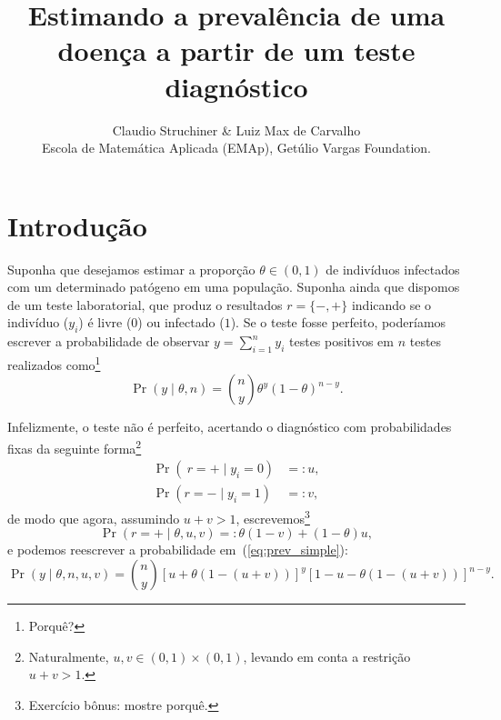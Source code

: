 \documentclass[a4paper, notitlepage, 10pt]{article}
\title{\vspace{-9ex}\centering \bf Estimando a prevalência de uma doença a partir de um teste diagnóstico}
\author{
Claudio Struchiner \& Luiz Max de Carvalho \\
Escola de Matemática Aplicada (EMAp), Get\'ulio Vargas Foundation.
}
\begin{document}
\maketitle

% 


\section*{Introdução}

Suponha que desejamos estimar a proporção $\theta \in (0, 1)$ de indivíduos infectados com um determinado patógeno em uma população.
Suponha ainda que dispomos de um teste laboratorial, que produz o resultados $r = \{-, +\}$ indicando se o indivíduo ($y_i$) é livre ($0$) ou infectado ($1$).
Se o teste fosse perfeito, poderíamos escrever a probabilidade de observar $y = \sum_{i =1}^n y_i$ testes positivos em $n$ testes realizados como\footnote{Porquê?}
\begin{equation}
\label{eq:prev_simple}
 \operatorname{Pr}\left( y \mid \theta, n \right) = \binom{n}{y} \theta^y (1-\theta)^{n-y}. 
\end{equation}

Infelizmente, o teste não é perfeito, acertando o diagnóstico com probabilidades fixas da seguinte forma\footnote{Naturalmente, $u, v \in (0, 1) \times (0, 1)$, levando em conta a restrição $u + v > 1$.}
\begin{align}
 \operatorname{Pr}\left(\ r = + \mid y_i = 0 \right) &=: u,\\
 \operatorname{Pr}\left( r = - \mid y_i = 1 \right) &=: v,
\end{align}
de modo que agora, assumindo $u + v > 1$, escrevemos\footnote{Exercício bônus: mostre porquê.}
\begin{equation}
  \operatorname{Pr}\left(r = + \mid \theta, u, v \right) =: \theta ( 1- v) + (1-\theta)u,
\end{equation}
e podemos reescrever a probabilidade em~(\ref{eq:prev_simple}):
\begin{equation}
 \operatorname{Pr}\left(y \mid \theta, n, u, v\right) = \binom{n}{y} \left[ u + \theta ( 1- (u  + v)) \right]^{y} \left[ 1 -u - \theta (1 -(u + v))\right]^{n-y}.
\end{equation}
\end{document}
